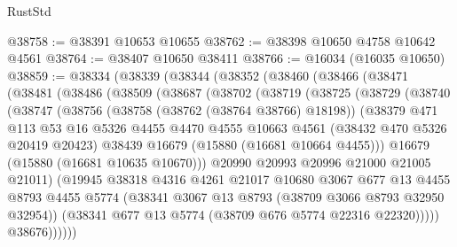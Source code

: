 \begin{lexlean}{RustStd}
\begin{coremodule}
@38758 := @38391 @10653 @10655
@38762 := @38398 @10650 @4758 @10642 @4561
@38764 := @38407 @10650 @38411
@38766 := @16034 (@16035 @10650)
@38859 := @38334
    (@38339
      (@38344
        (@38352
          (@38460
            (@38466
              (@38471
                (@38481
                  (@38486
                    (@38509
                      (@38687
                        (@38702
                          (@38719
                            (@38725
                              (@38729
                                (@38740
                                  (@38747
                                    (@38756
                                      (@38758 (@38762 (@38764 @38766) @18198))
                                      (@38379
                                        @471
                                        @113
                                        @53
                                        @16
                                        @5326
                                        @4455
                                        @4470
                                        @4555
                                        @10663
                                        @4561
                                        (@38432 @470 @5326 @20419 @20423)
                                        @38439
                                        @16679
                                        (@15880 (@16681 @10664 @4455)))
                                      @16679
                                      (@15880 (@16681 @10635 @10670)))
                                    @20990
                                    @20993
                                    @20996
                                    @21000
                                    @21005
                                    @21011)
                                  (@19945
                                    @38318
                                    @4316
                                    @4261
                                    @21017
                                    @10680
                                    @3067
                                    @677
                                    @13
                                    @4455
                                    @8793
                                    @4455
                                    @5774
                                    (@38341 @3067 @13 @8793 (@38709 @3066 @8793 @32950 @32954))
                                    (@38341 @677 @13 @5774 (@38709 @676 @5774 @22316 @22320)))))
                              @38676))))))

\end{coremodule}
\end{lexlean}
